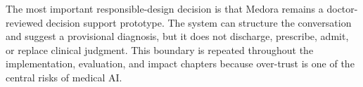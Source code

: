 The most important responsible-design decision is that Medora remains a doctor-reviewed decision support prototype. The system can structure the conversation and suggest a provisional diagnosis, but it does not discharge, prescribe, admit, or replace clinical judgment. This boundary is repeated throughout the implementation, evaluation, and impact chapters because over-trust is one of the central risks of medical AI.
